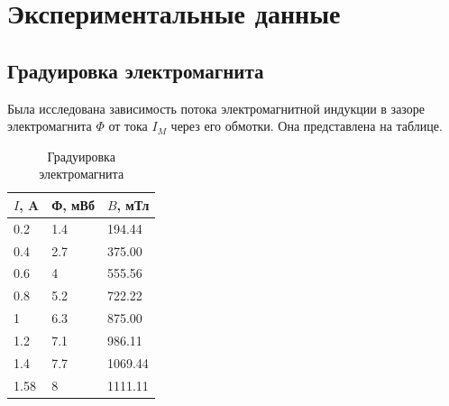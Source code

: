 \documentclass[a4paper, 14pt]{extarticle}%
\newcommand\ECaption[1]{%
     \captionsetup{font=footnotesize}%
     \caption{#1}}
\begin{document}
\section*{Экспериментальные данные}
\subsection*{Градуировка электромагнита}
Была исследована зависимость потока электромагнитной индукции в зазоре электромагнита $\Phi$ от тока $I_M$ через его  обмотки. Она представлена на таблице.

\begin{table}[h!]
\begin{center}
\begin{tabular}{|l|l|l|}
\hline
\rowcolor[HTML]{FFFFC7} 
$I$, A & Ф, мВб & $B$, мТл \\ \hline
0.2    & 1.4    & 194.44   \\ \hline
\rowcolor[HTML]{FFFFC7} 
0.4    & 2.7    & 375.00   \\ \hline
0.6    & 4      & 555.56   \\ \hline
\rowcolor[HTML]{FFFFC7} 
0.8    & 5.2    & 722.22   \\ \hline
1      & 6.3    & 875.00   \\ \hline
\rowcolor[HTML]{FFFFC7} 
1.2    & 7.1    & 986.11   \\ \hline
1.4    & 7.7    & 1069.44  \\ \hline
\rowcolor[HTML]{FFFFC7} 
1.58   & 8      & 1111.11  \\ \hline
\end{tabular}
\end{center}
\ECaption{Градуировка электромагнита}
\end{table}
\end{document}
